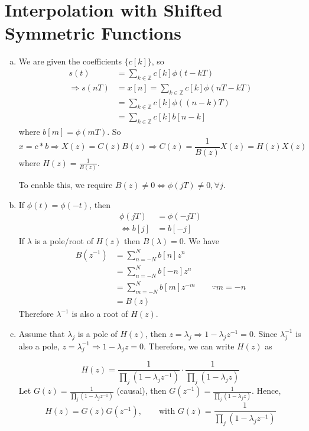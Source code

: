 \section{Interpolation with Shifted Symmetric Functions}\label{sec:p5}

\begin{enumerate}[(a)]
\item We are given the coefficients $\{c[k]\}$, so
\begin{align*}
	s(t) &= \sum_{k \in \mathbb{Z}} c[k] \phi (t-kT)\\
	\Rightarrow s(nT) &= x[n] = \sum_{k \in \mathbb{Z}}c[k] \phi(nT-kT) \\
	&= \sum_{k \in \mathbb{Z}} c[k] \phi((n-k)T) \\
	&= \sum_{k \in \mathbb{Z}} c[k] b[n-k]
\end{align*}
where $b[m] = \phi(mT)$. So
\[x = c * b \Rightarrow X(z) = C(z)B(z) \Rightarrow C(z) = \frac{1}{B(z)}X(z) = H(z)X(z)\]
where $H(z) = \frac{1}{B(z)}$.

To enable this, we require $B(z) \neq 0 \Leftrightarrow \phi(jT) \neq 0, \forall j$.

\item If $\phi(t) = \phi(-t)$, then
\begin{align*}
	\phi(jT) &= \phi(-jT) \\
	\Leftrightarrow b[j] &= b[-j]
\end{align*}
If $\lambda$ is a pole/root of $H(z)$ then $B(\lambda) = 0$. We have
\begin{align*}
	B(z^{-1})
	&= \sum_{n=-N}^{N} b[n] z^n \\
	&= \sum_{n=-N}^{N} b[-n] z^n \\
	&= \sum_{m=-N}^{N} b[m] z^{-m} \qquad \because m = -n \\
	&= B(z)
\end{align*}
Therefore $\lambda^{-1}$ is also a root of $H(z)$.

\item Assume that $\lambda_j$ is a pole of $H(z)$, then $z = \lambda_j \Rightarrow 1-\lambda_j z^{-1} = 0$. Since $\lambda_j^{-1}$ is also a pole, $z = \lambda_j^{-1} \Rightarrow 1 - \lambda_j z = 0$. Therefore, we can write $H(z)$ as

\[H(z)= \frac{1}{\prod_j (1-\lambda_j z^{-1})} \cdot \frac{1}{\prod_j (1-\lambda_jz)}\]
Let $G(z) = \frac{1}{\prod_j (1-\lambda_j z^{-1})}$ (causal), then $G(z^{-1}) = \frac{1}{\prod_j (1-\lambda_j z)}$. Hence, \[H(z) = G(z)G(z^{-1}), \qquad \text{with } G(z) = \frac{1}{\prod_j (1-\lambda_j z^{-1})}\]


\end{enumerate}
